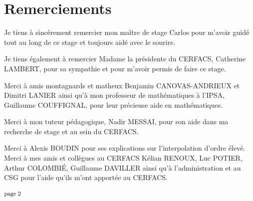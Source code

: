 \chapter*{Remerciements}

Je tiens à sincèrement remercier mon maître de stage Carlos pour m'avoir guidé tout au long de ce stage et toujours aidé avec le sourire.

\vspace{0.5cm}

Je tiens également à remercier Madame la présidente du CERFACS, Catherine LAMBERT, pour sa sympathie et pour m'avoir permis de faire ce stage. %

Merci à amis montagnards et matheux Benjamin CANOVAS-ANDRIEUX et Dimitri LANIER ainsi qu'à mon professeur de mathématiques à l'IPSA, Guillaume COUFFIGNAL, pour leur précieuse aide en mathématiques.

Merci à mon tuteur pédagogique, Nadir MESSAI, pour son aide dans ma recherche de stage et au sein du CERFACS.

Merci à Alexis BOUDIN pour ses explications sur l'interpolation d'ordre élevé.
Merci à mes amis et collègues au CERFACS Kélian RENOUX, Luc POTIER, Arthur COLOMBIÉ, Guillaume DAVILLER ainsi qu'à l'administration et au CSG pour l'aide qu'ils m'ont apportée au CERFACS.




\vspace*{\fill} %
\begin{center}
    \includegraphics[width=0.067\textwidth]{images/page_2.png}
\end{center}
\vspace*{-13.5cm} %
\vspace*{\fill} %
